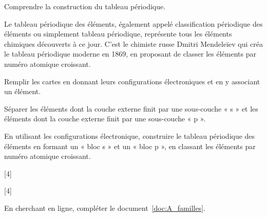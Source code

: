 \teteSndAtom


\vspace*{-12pt}
\begin{objectifs}
  \item Comprendre la construction du tableau périodique.
\end{objectifs}

\begin{contexte}
  Le tableau périodique des éléments, également appelé classification périodique des éléments ou simplement tableau périodique, représente tous les éléments chimiques découverts à ce jour. C'est le chimiste russe Dmitri Mendeleïev qui créa le tableau périodique moderne en 1869, en proposant de classer les éléments par numéro atomique croissant.

\end{contexte}


\mesure
Remplir les cartes en donnant leurs configurations électroniques et en y associant un élément.

\mesure
Séparer les éléments dont la couche externe finit par une sous-couche « s » et les éléments dont la couche externe finit par une sous-couche « p ».

\mesure
En utilisant les configurations électronique, construire le tableau périodique des éléments en formant un « bloc s » et un « bloc p », en classant les éléments par numéro atomique croissant.


[4]

[4]

\mesure En cherchant en ligne, compléter le document~\ref{doc:A_familles}.

